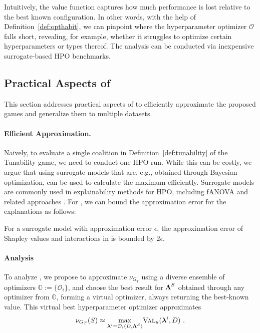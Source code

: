 \documentclass[letterpaper]{article} %
\begin{document}
Intuitively, the value function captures how much performance is lost relative to the best known configuration. 
In other words, with the help of Definition~\ref{def:opthabit}, we can pinpoint where the hyperparameter optimizer $\mathcal{O}$ falls short, revealing, for example, whether it struggles to optimize certain hyperparameters or types thereof. The analysis can be conducted via inexpensive surrogate-based HPO benchmarks.

\subsection{Practical Aspects of \tool}\label{sec:hypershap-in-practice}
This section addresses practical aspects of \tool to efficiently approximate the proposed games and generalize them to multiple datasets.

\paragraph{Efficient Approximation.}
Na{\"i}vely, to evaluate a single coalition in Definition~\ref{def:tunability} of the Tunability game, we need to conduct one HPO run.
While this can be costly, we argue that using surrogate models that are, e.g., obtained through Bayesian optimization, can be used to calculate the maximum efficiently. Surrogate models are commonly used in explainability methods for HPO, including fANOVA and related approaches \cite{fANOVA,DBLP:conf/aaai/BiedenkappLEHFH17,DBLP:conf/nips/MoosbauerHCLB21,DBLP:conf/automl/SegelGTBL23}.
For \tool, we can bound the approximation error for the explanations as follows:
\begin{theorem}
For a surrogate model with approximation error $\epsilon$, the approximation error of Shapley values and interactions in \tool is bounded by $2\epsilon$.
\end{theorem}
\paragraph{\opthabit Analysis} To analyze \opthabit, we propose to approximate $\nu_{G_T}$ using a diverse ensemble of optimizers $\mathbb{O}:= \{ \mathcal{O}_i\}$, and choose the best result for $\boldsymbol{\Lambda}^S$ obtained through any optimizer from $\mathbb{O}$, forming a virtual optimizer, always returning the best-known value.
This virtual best hyperparameter optimizer approximates
\[
\nu_{G_T}(S) \approx \underset{\boldsymbol{\lambda}^i = \mathcal{O}_i(D, \boldsymbol{\Lambda}^S)}{\max} \textsc{Val}_u(\boldsymbol{\lambda}^i, D) \,\, .
\]
\end{document}
